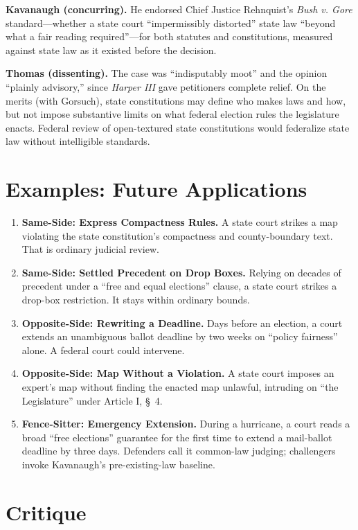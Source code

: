 \documentclass[12pt]{article}
\begin{document}
\textbf{Kavanaugh (concurring).} He endorsed Chief Justice Rehnquist's \textit{Bush v. Gore} standard---whether a state court ``impermissibly distorted'' state law ``beyond what a fair reading required''---for both statutes and constitutions, measured against state law as it existed before the decision.

\textbf{Thomas (dissenting).} The case was ``indisputably moot'' and the opinion ``plainly advisory,'' since \textit{Harper III} gave petitioners complete relief. On the merits (with Gorsuch), state constitutions may define who makes laws and how, but not impose substantive limits on what federal election rules the legislature enacts. Federal review of open-textured state constitutions would federalize state law without intelligible standards.

\section{Examples: Future Applications}

\begin{enumerate}
\item \textbf{Same-Side: Express Compactness Rules.} A state court strikes a map violating the state constitution's compactness and county-boundary text. That is ordinary judicial review.
\item \textbf{Same-Side: Settled Precedent on Drop Boxes.} Relying on decades of precedent under a ``free and equal elections'' clause, a state court strikes a drop-box restriction. It stays within ordinary bounds.
\item \textbf{Opposite-Side: Rewriting a Deadline.} Days before an election, a court extends an unambiguous ballot deadline by two weeks on ``policy fairness'' alone. A federal court could intervene.
\item \textbf{Opposite-Side: Map Without a Violation.} A state court imposes an expert's map without finding the enacted map unlawful, intruding on ``the Legislature'' under Article I, \S~4.
\item \textbf{Fence-Sitter: Emergency Extension.} During a hurricane, a court reads a broad ``free elections'' guarantee for the first time to extend a mail-ballot deadline by three days. Defenders call it common-law judging; challengers invoke Kavanaugh's pre-existing-law baseline.
\end{enumerate}

\section{Critique}
\end{document}
